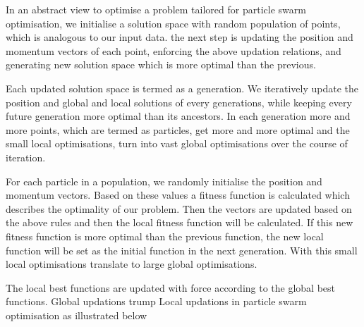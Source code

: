 \documentclass[12pt]{article}
\newcommand{\nd}{\noindent}
\begin{document}
\nd In an abstract view to optimise a problem tailored for particle swarm optimisation, we initialise a solution space with random population of points, which is analogous to our input data. the next step is updating the position and momentum vectors of each point, enforcing the above updation relations, and generating new solution space which is more optimal than the previous.

\nd Each updated solution space is termed as a generation. We iteratively update the position and global and local solutions of every generations, while keeping every future generation more optimal than its ancestors. In each generation more and more points, which are termed as particles, get more and more optimal and the small local optimisations, turn into vast global optimisations over the course of iteration. 

\nd For each particle in a population, we randomly initialise the position and momentum vectors. Based on these values a fitness function is calculated which describes the optimality of our problem. Then the vectors are updated based on the above rules and then the local fitness function will be calculated. If this new fitness function is more optimal than the previous function, the new local function will be set as the initial function in the next generation. With this small local optimisations translate to large global optimisations. 

\nd The local best functions are updated with force according to the global best functions. Global updations trump Local updations in particle swarm optimisation as illustrated below 
\end{document}
